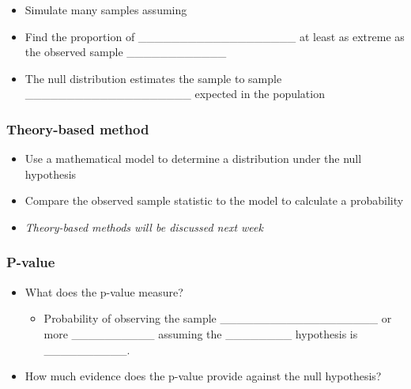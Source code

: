\documentclass[
]{report}
\providecommand{\tightlist}{%
  \setlength{\itemsep}{0pt}\setlength{\parskip}{0pt}}
\begin{document}
\begin{itemize}
\tightlist
\item
  Simulate many samples assuming
\end{itemize}

\vspace{0.2in}

\begin{itemize}
\item
  Find the proportion of \_\_\_\_\_\_\_\_\_\_\_\_\_\_\_\_\_\_\_ at least as extreme as the observed sample \_\_\_\_\_\_\_\_\_\_\_\_
\item
  The null distribution estimates the sample to sample \_\_\_\_\_\_\_\_\_\_\_\_\_\_\_\_\_\_\_\_ expected in the population
\end{itemize}


\hypertarget{theory-based-method}{%
\subsubsection*{Theory-based method}\label{theory-based-method}}

\begin{itemize}
\item
  Use a mathematical model to determine a distribution under the null hypothesis
\item
  Compare the observed sample statistic to the model to calculate a probability
\item
  \emph{Theory-based methods will be discussed next week}
\end{itemize}

\hypertarget{p-value}{%
\subsubsection*{P-value}\label{p-value}}


\begin{itemize}
\item
  What does the p-value measure?

  \begin{itemize}
  \tightlist
  \item
    Probability of observing the sample \_\_\_\_\_\_\_\_\_\_\_\_\_\_\_\_\_\_\_ or more \_\_\_\_\_\_\_\_\_\_
    assuming the \_\_\_\_\_\_\_\_ hypothesis is \_\_\_\_\_\_\_\_\_\_.
  \end{itemize}
\item
  How much evidence does the p-value provide against the null hypothesis?
\end{itemize}
\end{document}
